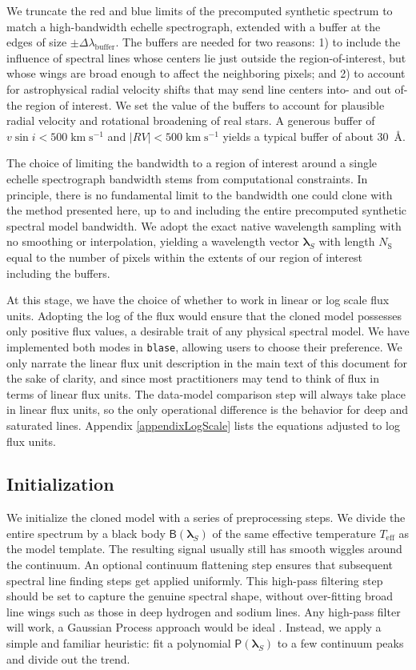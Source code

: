 \documentclass[twocolumn]{aastex631}
\def\kmps{\mathrm{km}\;\mathrm{s}^{-1}}
\begin{document}
We truncate the red and blue limits of the precomputed synthetic spectrum to match a high-bandwidth echelle spectrograph, extended with a buffer at the edges of size $\pm \Delta \lambda_{\mathrm{buffer}}$.  The buffers are needed for two reasons: 1) to include the influence of spectral lines whose centers lie just outside the region-of-interest, but whose wings are broad enough to affect the neighboring pixels; and 2) to account for astrophysical radial velocity shifts that may send line centers into- and out of- the region of interest.  We set the value of the buffers to account for plausible radial velocity and rotational broadening of real stars. A generous buffer of $v \sin{i} < 500 \;\kmps$ and $|RV|<500 \;\kmps$ yields a typical buffer of about 30~\AA.

The choice of limiting the bandwidth to a region of interest around a single echelle spectrograph bandwidth stems from computational constraints. In principle, there is no fundamental limit to the bandwidth one could clone with the method presented here, up to and including the entire precomputed synthetic spectral model bandwidth. We adopt the exact native wavelength sampling with no smoothing or interpolation, yielding a wavelength vector $\bm{\lambda}_S$ with length $N_\mathrm{S}$ equal to the number of pixels within the extents of our region of interest including the buffers.

At this stage, we have the choice of whether to work in linear or log scale flux units. Adopting the log of the flux would ensure that the cloned model possesses only positive flux values, a desirable trait of any physical spectral model. We have implemented both modes in \texttt{blase}, allowing users to choose their preference.  We only narrate the linear flux unit description in the main text of this document for the sake of clarity, and since most practitioners may tend to think of flux in terms of linear flux units.  The data-model comparison step will always take place in linear flux units, so the only operational difference is the behavior for deep and saturated lines.  Appendix \ref{appendixLogScale} lists the equations adjusted to log flux units.

\subsection{Initialization}\label{subsecInit}

We initialize the cloned model with a series of preprocessing steps. We divide the entire spectrum by a black body $\mathsf{B}(\bm{\lambda}_S)$ of the same effective temperature $T_{\mathrm{eff}}$ as the model template. The resulting signal usually still has smooth wiggles around the continuum. An optional continuum flattening step ensures that subsequent spectral line finding steps get applied uniformly. This high-pass filtering step should be set to capture the genuine spectral shape, without over-fitting broad line wings such as those in deep hydrogen and sodium lines. Any high-pass filter will work, a Gaussian Process approach would be ideal \citep{czekala15}.  Instead, we apply a simple and familiar heuristic: fit a polynomial $\mathsf{P}(\bm{\lambda}_S)$ to a few continuum peaks and divide out the trend.
\end{document}
